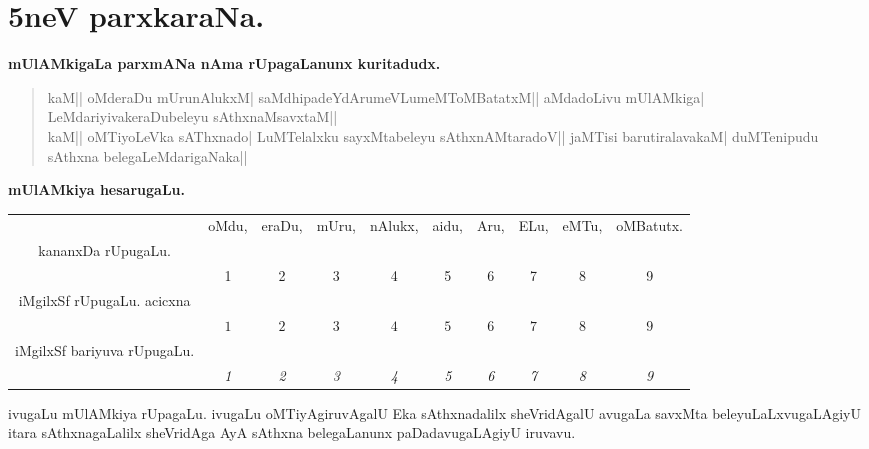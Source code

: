 \chapter{5neV parxkaraNa.}

\centerline{{\large\bf mUlAMkigaLa parxmANa nAma rUpagaLanunx kuritadudx.}}
\smallskip

\begin{verse}
kaM|| oMderaDu mUrunAlukxM| saMdhipadeYdArumeVLumeMToMBatatxM||
aMdadoLivu mUlAMkiga| LeMdariyivakeraDubeleyu sAthxnaMsavxtaM||\\

kaM|| oMTiyoLeVka sAThxnado| LuMTelalxku sayxMtabeleyu sAthxnAMtaradoV||
jaMTisi barutiralavakaM| duMTenipudu sAthxna belegaLeMdarigaNaka||
\end{verse}

\begin{center}
{\large\bf mUlAMkiya hesarugaLu.}
\end{center}

\begin{center}
\tabcolsep=3pt
\begin{tabular}{cccccccccc}
& oMdu, & eraDu, & mUru, & nAlukx, & aidu, & Aru, & ELu, & eMTu, & oMBatutx.\\
kananxDa rUpugaLu. & \\
& 1 & 2 & 3 & 4 & 5 & 6 & 7 & 8 & 9\\
iMgilxSf rUpugaLu. acicxna & \\
& $1$ & $2$ & $3$ & $4$ & $5$ & $6$ & $7$ & $8$ & $9$\\
iMgilxSf bariyuva rUpugaLu. &\\
& {\rm\em 1}& {\rm\em 2} & {\rm\em 3} & {\rm\em 4} & {\rm\em 5} & {\rm\em 6} & {\rm\em 7} & {\rm\em 8} & {\rm\em 9}\\ 
\end{tabular}
\end{center}

ivugaLu mUlAMkiya rUpagaLu. ivugaLu oMTiyAgiruvAgalU Eka sAthxnadalilx sheVridAgalU avugaLa savxMta beleyuLaLxvugaLAgiyU itara sAthxnagaLalilx sheVridAga AyA sAthxna belegaLanunx paDadavugaLAgiyU iruvavu.


